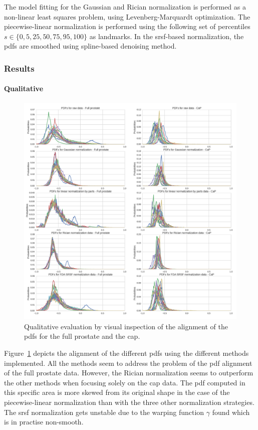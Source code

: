 The model fitting for the Gaussian and Rician normalization is performed as a non-linear least squares problem, using Levenberg-Marquardt optimization.
The piecewise-linear normalization is performed using the following set of percentiles $s \in \{0, 5, 25, 50, 75, 95, 100 \}$ as landmarks.
In the \ac{srsf}-based normalization, the \acp{pdf} are smoothed using spline-based denoising method.

\subsubsection{Results}\label{subsub:chp5:T2-norm:res}
\paragraph{Qualitative}

\begin{figure}
  \centering
  \includegraphics[width=1.\textwidth]{5_normalization/figures/T2-normalization/qualitative.png}
  \caption{Qualitative evaluation by visual inspection of the alignment of the \ac{pdf}s for the full prostate and the \ac{cap}.}
  \label{fig:qu}
\end{figure}

Figure~\ref{fig:qu} depicts the alignment of the different \ac{pdf}s using the different methods implemented. 
All the methods seem to address the problem of the \ac{pdf} alignment of the full prostate data.
However, the Rician normalization seems to outperform the other methods when focusing solely on the \ac{cap} data.
The \ac{pdf} computed in this specific area is more skewed from its original shape in the case of the piecewise-linear normalization than with the three other normalization strategies.
The \ac{srsf} normalization gets unstable due to the warping function $\gamma$ found which is in practise non-smooth.

